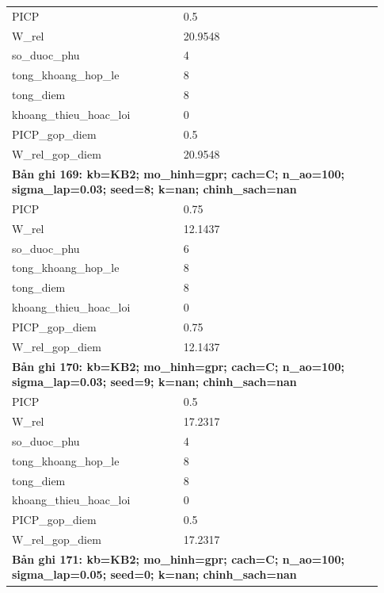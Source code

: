 \begin{longtable}{p{0.43\linewidth}p{0.50\linewidth}}
PICP & 0.5 \\
W\_\allowbreak rel & 20.9548 \\
so\_\allowbreak duoc\_\allowbreak phu & 4 \\
tong\_\allowbreak khoang\_\allowbreak hop\_\allowbreak le & 8 \\
tong\_\allowbreak diem & 8 \\
khoang\_\allowbreak thieu\_\allowbreak hoac\_\allowbreak loi & 0 \\
PICP\_\allowbreak gop\_\allowbreak diem & 0.5 \\
W\_\allowbreak rel\_\allowbreak gop\_\allowbreak diem & 20.9548 \\
\midrule
\multicolumn{2}{p{0.95\linewidth}}{\textbf{Bản ghi 169: kb=KB2; mo\_hinh=gpr; cach=C; n\_ao=100; sigma\_lap=0.03; seed=8; k=nan; chinh\_sach=nan}} \\
PICP & 0.75 \\
W\_\allowbreak rel & 12.1437 \\
so\_\allowbreak duoc\_\allowbreak phu & 6 \\
tong\_\allowbreak khoang\_\allowbreak hop\_\allowbreak le & 8 \\
tong\_\allowbreak diem & 8 \\
khoang\_\allowbreak thieu\_\allowbreak hoac\_\allowbreak loi & 0 \\
PICP\_\allowbreak gop\_\allowbreak diem & 0.75 \\
W\_\allowbreak rel\_\allowbreak gop\_\allowbreak diem & 12.1437 \\
\midrule
\multicolumn{2}{p{0.95\linewidth}}{\textbf{Bản ghi 170: kb=KB2; mo\_hinh=gpr; cach=C; n\_ao=100; sigma\_lap=0.03; seed=9; k=nan; chinh\_sach=nan}} \\
PICP & 0.5 \\
W\_\allowbreak rel & 17.2317 \\
so\_\allowbreak duoc\_\allowbreak phu & 4 \\
tong\_\allowbreak khoang\_\allowbreak hop\_\allowbreak le & 8 \\
tong\_\allowbreak diem & 8 \\
khoang\_\allowbreak thieu\_\allowbreak hoac\_\allowbreak loi & 0 \\
PICP\_\allowbreak gop\_\allowbreak diem & 0.5 \\
W\_\allowbreak rel\_\allowbreak gop\_\allowbreak diem & 17.2317 \\
\midrule
\multicolumn{2}{p{0.95\linewidth}}{\textbf{Bản ghi 171: kb=KB2; mo\_hinh=gpr; cach=C; n\_ao=100; sigma\_lap=0.05; seed=0; k=nan; chinh\_sach=nan}} \\

\end{longtable}
